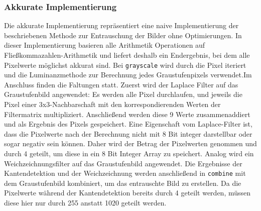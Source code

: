 \documentclass[course=erap]{aspdoc}
\begin{document}
\subsubsection{Akkurate Implementierung}
Die akkurate Implementierung repräsentiert eine naive Implementierung der beschriebenen Methode zur Entrauschung der Bilder ohne Optimierungen. In dieser Implementierung basieren alle Arithmetik Operationen auf Fließkommazahlen-Arithmetik und liefert deshalb ein Endergebnis, bei dem alle Pixelwerte möglichst akkurat sind. \newline 
Bei \texttt{grayscale} wird durch die Pixel iteriert und die Luminanzmethode zur Berechnung jedes Graustufenpixels verwendet.\newline Im Anschluss finden die Faltungen statt. Zuerst wird der Laplace Filter auf das Graustufenbild angewendet: Es werden alle Pixel durchlaufen, und jeweils die Pixel einer 3x3-Nachbarschaft mit den korrespondierenden Werten der Filtermatrix multipliziert. Anschließend werden diese 9 Werte zusammenaddiert und als Ergebnis des Pixels gespeichert. Eine Eigenschaft vom Laplace-Filter ist, dass die Pixelwerte nach der Berechnung nicht mit 8 Bit integer darstellbar oder sogar negativ sein können. Daher wird der Betrag der Pixelwerten genommen und durch 4 geteilt, um diese in ein 8 Bit Integer Array zu speichert. \newline Analog wird ein Weichzeichnungsfilter auf das Graustufenbild angewendet. Die Ergebnisse der Kantendetektion und der Weichzeichnung werden anschließend in \texttt{combine} mit dem Graustufenbild kombiniert, um das entrauschte Bild zu erstellen. Da die Pixelwerte während der Kantendetektion bereits durch 4 geteilt werden, müssen diese hier nur durch 255 anstatt 1020 geteilt werden.
\end{document}
